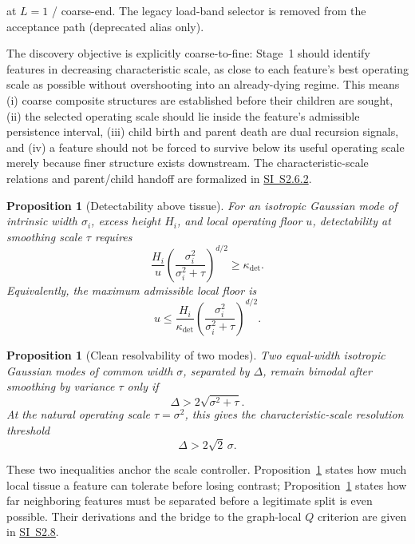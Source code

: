 \documentclass[11pt]{article}
\theoremstyle{definition}
\theoremstyle{plain}
\newtheorem{proposition}[definition]{Proposition}
\begin{document}
at $L=1$ / coarse-end. The legacy load-band selector is removed from the acceptance path (deprecated alias only).

The discovery objective is explicitly coarse-to-fine: Stage~1 should identify features in decreasing characteristic scale, as close to each feature's best operating scale as possible without overshooting into an already-dying regime. This means (i) coarse composite structures are established before their children are sought, (ii) the selected operating scale should lie inside the feature's admissible persistence interval, (iii) child birth and parent death are dual recursion signals, and (iv) a feature should not be forced to survive below its useful operating scale merely because finer structure exists downstream. The characteristic-scale relations and parent/child handoff are formalized in \hyperref[sec:si-feature-persistence]{SI~S2.6.2}.

\begin{proposition}[Detectability above tissue]
\label{prop:paper-detectability}
For an isotropic Gaussian mode of intrinsic width $\sigma_i$, excess height $H_i$, and local operating floor $u$, detectability at smoothing scale $\tau$ requires
\[
\frac{H_i}{u}
\left(\frac{\sigma_i^2}{\sigma_i^2+\tau}\right)^{d/2}
\ge \kappa_{\mathrm{det}}.
\]
Equivalently, the maximum admissible local floor is
\[
u \le
\frac{H_i}{\kappa_{\mathrm{det}}}
\left(\frac{\sigma_i^2}{\sigma_i^2+\tau}\right)^{d/2}.
\]
\end{proposition}

\begin{proposition}[Clean resolvability of two modes]
\label{prop:paper-resolvability}
Two equal-width isotropic Gaussian modes of common width $\sigma$, separated by $\Delta$, remain bimodal after smoothing by variance $\tau$ only if
\[
\Delta > 2\sqrt{\sigma^2+\tau}.
\]
At the natural operating scale $\tau=\sigma^2$, this gives the characteristic-scale resolution threshold
\[
\Delta > 2\sqrt{2}\,\sigma.
\]
\end{proposition}

These two inequalities anchor the scale controller. Proposition~\ref{prop:paper-detectability} states how much local tissue a feature can tolerate before losing contrast; Proposition~\ref{prop:paper-resolvability} states how far neighboring features must be separated before a legitimate split is even possible. Their derivations and the bridge to the graph-local $Q$ criterion are given in \hyperref[sec:si-resolution-theory]{SI~S2.8}.
\end{document}
